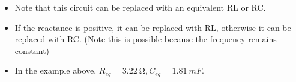 \documentclass{article}
\begin{document}
\begin{itemize}
    \item Note that this circuit can be replaced with an equivalent RL or RC.
    \item If the reactance is positive, it can be replaced with RL, otherwise it can be replaced with RC. (Note this is possible because the frequency remains constant)
    \item In the example above, $R_{eq}=\SI{3.22}{\ohm}, C_{eq}=\SI{1.81}{mF}$.
\end{itemize}
\end{document}
